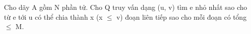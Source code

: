 Cho dãy A gồm N phần tử. Cho Q truy vấn dạng (u, v) tìm e nhỏ nhất sao cho từ e tới u có thể chia thành x (x  $\le$  v) đoạn liên tiếp sao cho mỗi đoạn có tổng  $\le$  M.